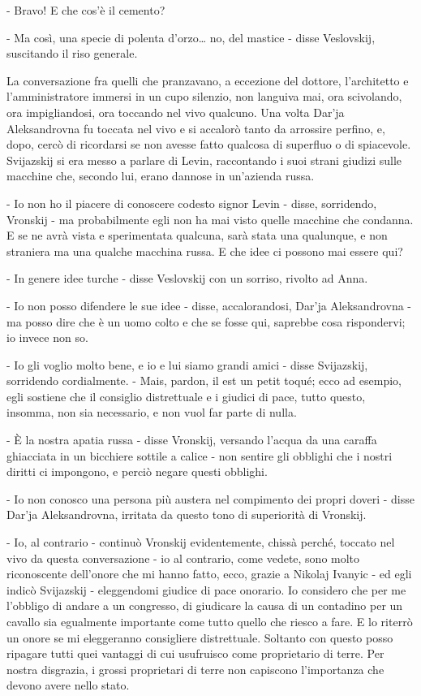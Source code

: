 - Bravo! E che cos'è il cemento? 

- Ma così, una specie di polenta d'orzo\ldots{} no, del mastice - disse Veslovskij, suscitando il riso generale. 

La conversazione fra quelli che pranzavano, a eccezione del dottore, l'architetto e l'amministratore immersi in un cupo silenzio, non languiva mai, ora scivolando, ora impigliandosi, ora toccando nel vivo qualcuno. Una volta Dar'ja Aleksandrovna fu toccata nel vivo e si accalorò tanto da arrossire perfino, e, dopo, cercò di ricordarsi se non avesse fatto qualcosa di superfluo o di spiacevole. Svijazskij si era messo a parlare di Levin, raccontando i suoi strani giudizi sulle macchine che, secondo lui, erano dannose in un'azienda russa. 

- Io non ho il piacere di conoscere codesto signor Levin - disse, sorridendo, Vronskij - ma probabilmente egli non ha mai visto quelle macchine che condanna. E se ne avrà vista e sperimentata qualcuna, sarà stata una qualunque, e non straniera ma una qualche macchina russa. E che idee ci possono mai essere qui? 

- In genere idee turche - disse Veslovskij con un sorriso, rivolto ad Anna. 

- Io non posso difendere le sue idee - disse, accalorandosi, Dar'ja Aleksandrovna - ma posso dire che è un uomo colto e che se fosse qui, saprebbe cosa rispondervi; io invece non so. 

- Io gli voglio molto bene, e io e lui siamo grandi amici - disse Svijazskij, sorridendo cordialmente. - Mais, pardon, il est un petit toqué; ecco ad esempio, egli sostiene che il consiglio distrettuale e i giudici di pace, tutto questo, insomma, non sia necessario, e non vuol far parte di nulla. 

- È la nostra apatia russa - disse Vronskij, versando l'acqua da una caraffa ghiacciata in un bicchiere sottile a calice - non sentire gli obblighi che i nostri diritti ci impongono, e perciò negare questi obblighi. 

- Io non conosco una persona più austera nel compimento dei propri doveri - disse Dar'ja Aleksandrovna, irritata da questo tono di superiorità di Vronskij. 

- Io, al contrario - continuò Vronskij evidentemente, chissà perché, toccato nel vivo da questa conversazione - io al contrario, come vedete, sono molto riconoscente dell'onore che mi hanno fatto, ecco, grazie a Nikolaj Ivanyic - ed egli indicò Svijazskij - eleggendomi giudice di pace onorario. Io considero che per me l'obbligo di andare a un congresso, di giudicare la causa di un contadino per un cavallo sia egualmente importante come tutto quello che riesco a fare. E lo riterrò un onore se mi eleggeranno consigliere distrettuale. Soltanto con questo posso ripagare tutti quei vantaggi di cui usufruisco come proprietario di terre. Per nostra disgrazia, i grossi proprietari di terre non capiscono l'importanza che devono avere nello stato. 

